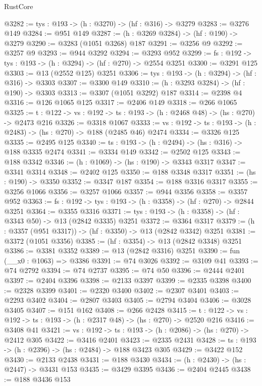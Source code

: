 \begin{lexlean}{RustCore}
\begin{coremodule}
@3282 := {tys : @193} -> (h : @3270) -> (hf : @316) -> @3279
@3283 := @3276 @149
@3284 := @951 @149
@3287 := (h : @3269 @3284) -> (hf : @190) -> @3279
@3290 := @3283 (@1051 @3268) @187
@3291 := @3256 @9
@3292 := @3257 @9
@3293 := @944 @3292
@3294 := @3293 @952
@3299 := {fs : @192} -> {tys : @193} -> (h : @3294) -> (hf : @270) -> @2554 @3251
@3300 := @3291 @125
@3303 := @13 (@2552 @125) @3251
@3306 := {tys : @193} -> (h : @3294) -> (hf : @316) -> @3303
@3307 := @3300 @149
@3310 := (h : @3293 @3284) -> (hf : @190) -> @3303
@3313 := @3307 (@1051 @3292) @187
@3314 := @2398 @4
@3316 := @126 @1065 @125
@3317 := @2406 @149
@3318 := @266 @1065
@3325 := {t : @122} -> {vs : @192} -> {ts : @193} -> (h : @2468 @48) -> (hs : @270) -> @2473 @216
@3326 := @3318 @1067
@3333 := {vs : @192} -> {ts : @193} -> (h : @2483) -> (hs : @270) -> @188 (@2485 @46) @2474
@3334 := @3326 @125
@3335 := @2495 @125
@3340 := {ts : @193} -> (h : @2494) -> (hs : @316) -> @188 @3335 @2474
@3341 := @3334 @149
@3342 := @2502 @125
@3343 := @188 @3342
@3346 := (h : @1069) -> (hs : @190) -> @3343 @3317
@3347 := @3341 @3314
@3348 := @2402 @125
@3350 := @188 @3348 @3317
@3351 := (hs : @190) -> @3350
@3352 := @3347 @187
@3354 := @188 @3316 @3317
@3355 := @3256 @1066
@3356 := @3257 @1066
@3357 := @944 @3356
@3358 := @3357 @952
@3363 := {fs : @192} -> {tys : @193} -> (h : @3358) -> (hf : @270) -> @2844 @3251
@3364 := @3355 @3316
@3371 := {tys : @193} -> (h : @3358) -> (hf : @3343 @50) -> @13 (@2842 @3335) @3251
@3372 := @3364 @3317
@3379 := (h : @3357 (@951 @3317)) -> (hf : @3350) -> @13 (@2842 @3342) @3251
@3381 := @3372 (@1051 @3356)
@3385 := (hf : @3354) -> @13 (@2842 @3348) @3251
@3386 := @3381 @3352
@3389 := @13 (@2842 @3316) @3251
@3390 := fun (__x0 : @1063) => @3386
@3391 := @74 @3026
@3392 := @3109 @41
@3393 := @74 @2792
@3394 := @74 @2737
@3395 := @74 @50
@3396 := @2444 @2401
@3397 := @2404 @3396
@3398 := @2133 @3397
@3399 := @2335 @3398
@3400 := @2328 @3399
@3401 := @2320 @3400
@3402 := @2307 @3401
@3403 := @2293 @3402
@3404 := @2807 @3403
@3405 := @2794 @3404
@3406 := @3028 @3405
@3407 := @151 @162
@3408 := @266 @2428
@3415 := {t : @122} -> {vs : @192} -> {ts : @193} -> (h : @2317 @48) -> (hs : @270) -> @2520 @216
@3416 := @3408 @41
@3421 := {vs : @192} -> {ts : @193} -> (h : @2086) -> (hs : @270) -> @2412 @305
@3422 := @3416 @2401
@3423 := @2335 @2431
@3428 := {ts : @193} -> (h : @2396) -> (hs : @2484) -> @188 @3423 @305
@3429 := @3422 @152
@3430 := @2133 @2438
@3431 := @188 @3430
@3434 := (h : @2430) -> (hs : @2447) -> @3431 @153
@3435 := @3429 @3395
@3436 := @2404 @2445
@3438 := @188 @3436 @153

\end{coremodule}
\end{lexlean}
